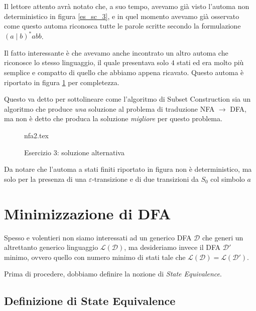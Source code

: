 \documentclass[class=book, crop=false, oneside, 12pt]{standalone}
\begin{document}
Il lettore attento avrà notato che, a suo tempo, avevamo già visto l'automa non deterministico in figura \ref{es_sc_3}, e in quel momento avevamo già osservato come questo automa riconosca tutte le parole scritte secondo la formulazione \((a \mid b)^* abb\).

Il fatto interessante è che avevamo anche incontrato un altro automa che riconosce lo stesso linguaggio, il quale presentava solo \(4\) stati ed era molto più semplice e compatto di quello che abbiamo appena ricavato. Questo automa è riportato in figura \ref{sol_sc_3_v2} per completezza.

Questo va detto per sottolineare come l'algoritmo di Subset Construction sia un algoritmo che produce \emph{una} soluzione al problema di traduzione NFA \(\to\) DFA, ma non è detto che produca la soluzione \emph{migliore} per questo problema.

\begin{figure}[htb]
    \centering
    {nfa2.tex}
    \caption{Esercizio 3: soluzione alternativa}
    \label{sol_sc_3_v2}
\end{figure}

Da notare che l'automa a stati finiti riportato in figura non è deterministico, ma solo per la presenza di una \(\varepsilon\)-transizione e di due transizioni da \(S_{0}\) col simbolo \(a\)

\section{Minimizzazione di DFA}
Spesso e volentieri non siamo interessati ad un generico DFA \(\mathcal{D}\) che generi un altrettanto generico linguaggio \(\mathcal{L(D)}\), ma desideriamo invece il DFA \(\mathcal{D}'\) minimo, ovvero quello con numero minimo di stati tale che \(\mathcal{L(D)} = \mathcal{L(D')}\). 


Prima di procedere, dobbiamo definire la nozione di \emph{State Equivalence}.

\subsection{Definizione di State Equivalence}
\end{document}

